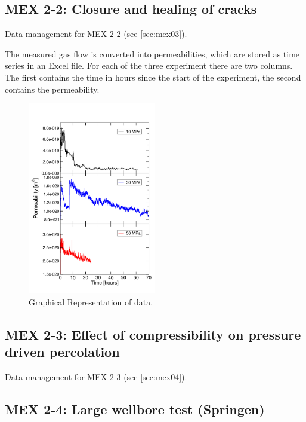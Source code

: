 \subsection{MEX 2-2: Closure and healing of cracks}

Data management for MEX 2-2 (see \ref{sec:mex03}).

The measured gas flow is converted into permeabilities, which are stored as time series in an Excel file. For each of the three experiment there are two columns. The first contains the time in hours since the start of the experiment, the second contains the permeability. 

\begin{figure}[!ht]
\centering
\includegraphics[width=0.5\textwidth]{figures/mex3-perme-time-comparison.png}
\caption{Graphical Representation of data.}
\label{fig:ME3-perme-exp-dmp}
\end{figure}

\subsection{MEX 2-3: Effect of compressibility on pressure driven percolation}

Data management for MEX 2-3 (see \ref{sec:mex04}).

\subsection{MEX 2-4: Large wellbore test (Springen)}

